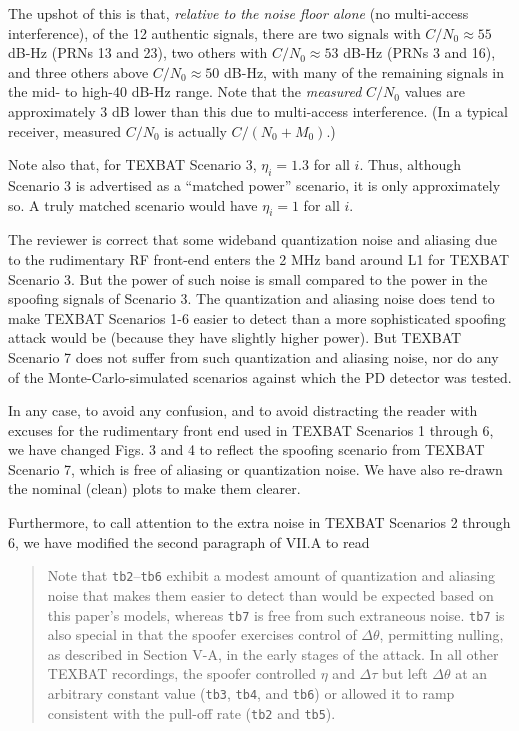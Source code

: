 \documentclass[12pt]{report}
\begin{document}
    The upshot of this is that, \emph{relative to the noise floor alone} (no
    multi-access interference), of the 12 authentic signals, there are two
    signals with $C/N_0 \approx 55$ dB-Hz (PRNs 13 and 23), two others with
    $C/N_0 \approx 53$ dB-Hz (PRNs 3 and 16), and three others above
    $C/N_0 \approx 50$ dB-Hz, with many of the remaining signals in the mid-
    to high-40 dB-Hz range.  Note that the \emph{measured} $C/N_0$ values are
    approximately 3 dB lower than this due to multi-access interference. (In a
    typical receiver, measured $C/N_0$ is actually $C/(N_0 + M_0)$.)

    Note also that, for TEXBAT Scenario 3, $\eta_i = 1.3$ for all $i$.  Thus,
    although Scenario 3 is advertised as a ``matched power'' scenario, it is
    only approximately so.  A truly matched scenario would have $\eta_i = 1$
    for all $i$.

    The reviewer is correct that some wideband quantization noise and aliasing
    due to the rudimentary RF front-end enters the 2 MHz band around L1 for
    TEXBAT Scenario 3.  But the power of such noise is small compared to the
    power in the spoofing signals of Scenario 3.  The quantization and
    aliasing noise does tend to make TEXBAT Scenarios 1-6 easier to detect
    than a more sophisticated spoofing attack would be (because they have
    slightly higher power).  But TEXBAT Scenario 7 does not suffer from such
    quantization and aliasing noise, nor do any of the Monte-Carlo-simulated
    scenarios against which the PD detector was tested.

    In any case, to avoid any confusion, and to avoid distracting the reader
    with excuses for the rudimentary front end used in TEXBAT Scenarios 1
    through 6, we have changed Figs. 3 and 4 to reflect the spoofing scenario
    from TEXBAT Scenario 7, which is free of aliasing or quantization noise.
    We have also re-drawn the nominal (clean) plots to make them clearer.

    Furthermore, to call attention to the extra noise in TEXBAT Scenarios 2
    through 6, we have modified the second paragraph of VII.A to read

    \begin{quotation}
      Note that {\tt tb2}--{\tt tb6} exhibit a modest amount of quantization
      and aliasing noise that makes them easier to detect than would be
      expected based on this paper's models, whereas {\tt tb7} is free from
      such extraneous noise.  {\tt tb7} is also special in that the spoofer
      exercises control of $\Delta \theta$, permitting nulling, as described
      in Section V-A, in the early stages of the attack.  In all other TEXBAT
      recordings, the spoofer controlled $\eta$ and $\Delta \tau$ but left
      $\Delta \theta$ at an arbitrary constant value ({\tt tb3}, {\tt tb4},
      and {\tt tb6}) or allowed it to ramp consistent with the pull-off rate
      ({\tt tb2} and {\tt tb5}).
    \end{quotation}
    
\end{document}
